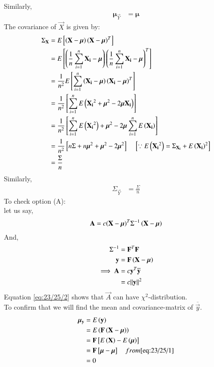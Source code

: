 \documentclass[journal,12pt,onecolumn]{IEEEtran}
\theoremstyle{remark}
\begin{document}
Similarly,
\begin{align}
{\bm{\mu}}_{\vec{Y}} &= \bm{\mu}
\end{align}
The covariance of $\vec{X}$ is given by: 
\begin{align}
\Sigma_{\mathbf{X}} &= E{}\left[\left(\mathbf{X}-\bm{\mu}\right){\left(\mathbf{X}-\bm{\mu}\right)}^T\right] \\
                 &= E{}\left[\left(\frac{1}{n}\sum_{i=1}^{n}\mathbf{X_i}-\bm{\mu}\right){\left(\frac{1}{n}\sum_{i=1}^{n}\mathbf{X_i}-\bm{\mu}\right)}^T\right] \\
                 &= \frac{1}{n^2}E{}\left[\sum_{i=1}^{n}\left(\mathbf{X_i}-\bm{\mu}\right){\left(\mathbf{X_i}-\bm{\mu}\right)}^T\right] \\
                 &= \frac{1}{n^2}{}\left[\sum_{i=1}^{n}E\left({\mathbf{X_i}}^2+{\bm{\mu}}^2-2\bm{\mu}\mathbf{X_i}\right)\right] \\
                 &= \frac{1}{n^2}{}\left[\sum_{i=1}^{n}E\left({\mathbf{X_i}}^2\right)+{\bm{\mu}}^2-2\bm{\mu}\sum_{i=1}^{n}E\left(\mathbf{X_i}\right)\right] \\
                 &= \frac{1}{n^2}{}\left[n\Sigma+n{\bm{\mu}}^2+{\bm{\mu}}^2-2{\bm{\mu}}^2\right] \quad {}\left[\because E\left({\mathbf{X_i}}^2\right)={\Sigma}_{\mathbf{X_i}}+{E\left(\mathbf{X_i}\right)}^2\right] \\
                 &= \frac{\Sigma}{n}         
\end{align}
Similarly,
\begin{align}
\Sigma_{\vec{Y}} &= \frac{\Sigma}{n} 
\end{align}
To check option (A): \\
let us say,
\begin{align}
\mathbf{A} &= c{\left(\mathbf{X}-\bm{\mu}\right)}^T{\Sigma}^{-1}\left(\mathbf{X}-\bm{\mu}\right) \\
\end{align}
And,
\begin{align}
{\Sigma}^{-1} &= {\mathbf{F}}^T\mathbf{F} \label{eq:23/25/3} \\
\mathbf{y} &= \mathbf{F}\left(\mathbf{X}-\bm{\mu}\right) \\
\implies \mathbf{A} &= c{\mathbf{y}}^T\overline{\mathbf{y}} \\
                 &= c{\left\lVert\mathbf{y}\right\rVert}^2  \label{eq:23/25/2}
\end{align}
Equation \eqref{eq:23/25/2} shows that $\vec{A}$ can have ${\chi}^2$-distribution. \\
To confirm that we will find the mean and covariance-matrix of $\overline{\vec{y}}$.
\begin{align}
{\bm{\mu}}_{\mathbf{y}} &= E\left(\mathbf{y}\right) \\
                           &= E\left(\mathbf{F}\left(\mathbf{X}-\bm{\mu}\right)\right) \\
                           &= \mathbf{F}{}\left[E\left(\mathbf{X}\right)-E\left(\bm{\mu}\right)\right] \\
                           &= \mathbf{F}{}\left[\bm{\mu}-\bm{\mu}\right] \quad from \eqref{eq:23/25/1} \\
                           &= 0 
\end{align}
\end{document}
